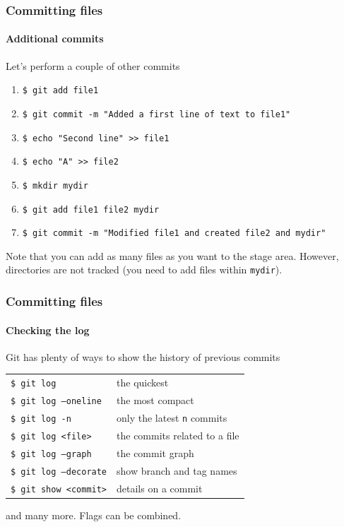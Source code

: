 \begin{frame}
\frametitle{Committing files}
\framesubtitle{Additional commits}

\begin{block}{Let's perform a couple of other commits}
\begin{enumerate}
\item \texttt{\$ git add file1} \\
\item \texttt{\$ git commit -m "Added a first line of text to file1"} \\
\item \texttt{\$ echo "Second line" >\;\!\!> file1} \\
\item \texttt{\$ echo "A" >\;\!\!> file2} \\ 
\item \texttt{\$ mkdir mydir} \\ 
\item \texttt{\$ git add file1 file2 mydir} \\
\item \texttt{\$ git commit -m "Modified file1 and created file2 and mydir"} 
\end{enumerate}
Note that you can add as many files as you want to the stage area. However, directories are not tracked (you need to add files within \texttt{mydir}).
\end{block}

\end{frame}

\begin{frame}
\frametitle{Committing files}
\framesubtitle{Checking the log}

\begin{block}{Git has plenty of ways to show the history of previous commits}
\begin{tabular}{ll}
\texttt{\$ git log} & the quickest \\
\texttt{\$ git log ---oneline} & the most compact \\
\texttt{\$ git log -n} & only the latest \texttt{n} commits \\
\texttt{\$ git log <file>} & the commits related to a file \\
\texttt{\$ git log ---graph} & the commit graph \\
\texttt{\$ git log ---decorate} & show branch and tag names \\
\texttt{\$ git show <commit>} & details on a commit
\end{tabular}

\medskip
and many more. Flags can be combined.
\end{block}
\end{frame}

